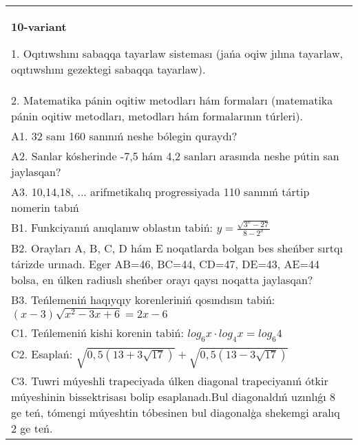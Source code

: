 \documentclass{article}
\begin{document}
\begin{tabular}{m{17cm}}
\textbf{10-variant}

1. Oqıtıwshını sabaqqa tayarlaw sisteması (jańa oqiw jılına tayarlaw, oqıtıwshını gezektegi sabaqqa tayarlaw). \\
2. Matematika pánin oqitiw metodları hám formaları (matematika pánin oqitiw metodları, metodları hám formalarının túrleri). \\
A1. 32 sanı 160 sanınıń neshe bólegin quraydı? \\
A2. Sanlar kósherinde -7,5 hám 4,2 sanları arasında neshe pútin san jaylasqan? \\
A3. 10,14,18, ... arifmetikalıq progressiyada 110 sanınıń tártip nomerin tabıń \\
B1. Funkciyanıń anıqlanıw oblastın tabiń: \(y = \frac{\sqrt{3^{x} - 27}}{8 - 2^{x}}\) \\
B2. Orayları A, B, C, D hám E noqatlarda bolgan bes sheńber sırtqı tárizde urınadı. Eger AB=46, BC=44, CD=47, DE=43, AE=44 bolsa, en úlken radiuslı sheńber orayı qaysı noqatta jaylasqan? \\
B3. Teńlemeniń haqıyqıy korenleriniń qosındısın tabiń: \((x-3) \sqrt{x^{2} - 3x + 6} = 2x - 6\) \\
C1. Teńlemeniń kishi korenin tabiń: \(log_{6}x \cdot log_{4}x = log_{6}4\) \\
C2. Esaplań: \(\sqrt{0,5 (13 + 3\sqrt{17}) } + \sqrt{0,5 (13 - 3\sqrt{17}) }\) \\
C3. Tuwri múyeshli trapeciyada úlken diagonal trapeciyanıń ótkir múyeshinin bissektrisası bolip esaplanadı.Bul diagonaldıń uzınlıǵı 8 ge teń, tómengi múyeshtin tóbesinen bul diagonalģa shekemgi aralıq 2 ge teń. \\

\end{tabular}
\vspace{1cm}
\end{document}
